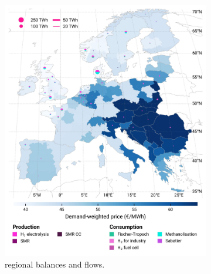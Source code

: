 \documentclass[final,5p,times,twocolumn,sort&compress]{elsarticle}
\begin{document}
\cleardoublepage
\begin{figure}[htbp]
  \centering
  \begin{subfigure}[t]{0.49\textwidth}
      \vspace{0pt}
      \includegraphics[width=1\textwidth]{maps/no-pipelines-no-pcipmi/base_s_adm___2030-balance_map_H2}
      \vspace{-0.5cm}
      \caption{ regional balances and flows.}
      \label{fig:DI_lt_2030_h2}
  \end{subfigure}
  \hfill
  \begin{subfigure}[t]{0.49\textwidth}
      \vspace{0pt}

\end{subfigure}
\end{figure}
\end{document}
